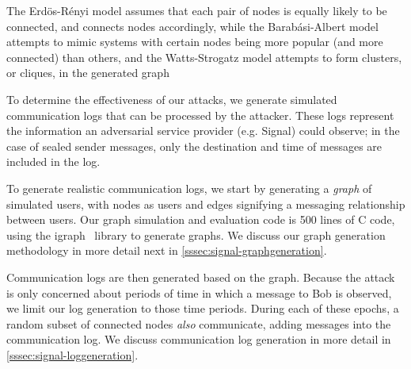 

The Erd{\"o}s-R{\'e}nyi model
assumes that each pair of nodes is equally likely to be connected, and connects
nodes accordingly, while the Barab{\'a}si-Albert model attempts to mimic systems
with certain nodes being more popular (and more connected) than others, and the
Watts-Strogatz model attempts to form clusters, or cliques, in the generated
graph
\fi






To determine the effectiveness of our attacks, we generate simulated
communication logs that can be processed by the attacker. These logs represent
the information an adversarial service provider (e.g. Signal) could observe; in
the case of sealed sender messages, only the destination and time of messages
are included in the log.

To generate realistic communication logs, we start by generating a
{\em graph} of simulated users, with nodes as users and edges signifying a
messaging relationship between users. Our graph simulation and evaluation code
is 500 lines of C code, using the igraph~\cite{igraph} library to generate
graphs. We discuss our graph generation methodology in more detail next in
\cref{sssec:signal-graphgeneration}.

Communication logs are then generated based on the graph.  Because the attack is
only concerned about periods of time in which a message to Bob is observed, we
limit our log generation to those time periods.  During each of these epochs, a
random subset of connected nodes {\em also} communicate, adding messages into
the communication log. We discuss communication log generation in more detail in
\cref{sssec:signal-loggeneration}.

